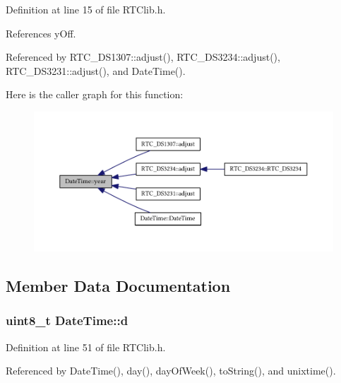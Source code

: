 Definition at line 15 of file R\+T\+Clib.\+h.



References y\+Off.



Referenced by R\+T\+C\+\_\+\+D\+S1307\+::adjust(), R\+T\+C\+\_\+\+D\+S3234\+::adjust(), R\+T\+C\+\_\+\+D\+S3231\+::adjust(), and Date\+Time().



Here is the caller graph for this function\+:
\nopagebreak
\begin{figure}[H]
\begin{center}
\leavevmode
\includegraphics[width=350pt]{class_date_time_a019cf3799acc8c9a44fdc501fce33881_icgraph}
\end{center}
\end{figure}




\subsection{Member Data Documentation}
\subsubsection[{\texorpdfstring{d}{d}}]{\setlength{\rightskip}{0pt plus 5cm}uint8\+\_\+t Date\+Time\+::d\hspace{0.3cm}{\ttfamily [protected]}}\hypertarget{class_date_time_abad2ae4520c8a7f87fd242c0d9a53256}{}\label{class_date_time_abad2ae4520c8a7f87fd242c0d9a53256}


Definition at line 51 of file R\+T\+Clib.\+h.



Referenced by Date\+Time(), day(), day\+Of\+Week(), to\+String(), and unixtime().

